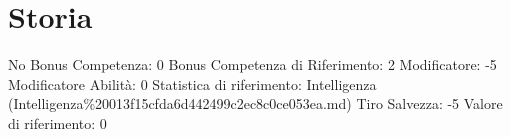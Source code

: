 \section{Storia}\label{storia}

\begin{description}
\tightlist
\item[Tags: ABI]
No Bonus Competenza: 0 Bonus Competenza di Riferimento: 2 Modificatore:
-5 Modificatore Abilità: 0 Statistica di riferimento: Intelligenza
(Intelligenza\%20013f15cfda6d442499c2ec8c0ce053ea.md) Tiro Salvezza: -5
Valore di riferimento: 0
\end{description}
